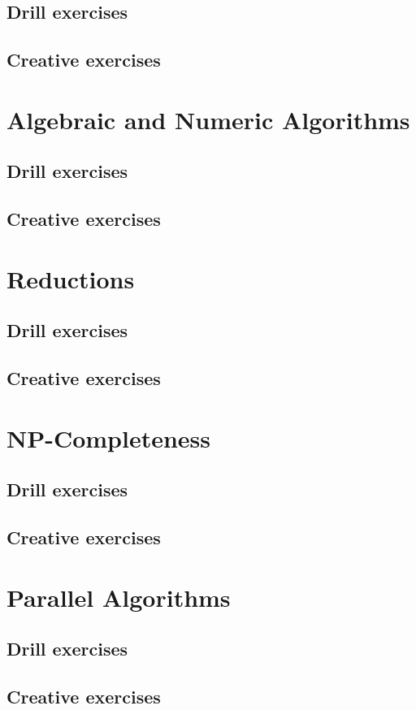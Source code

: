 \documentclass[a4paper,11pt]{memoir}
\begin{document}
    \section*{Drill exercises}
    \section*{Creative exercises}

    \chapter{Algebraic and Numeric Algorithms}
    \section*{Drill exercises}
    \section*{Creative exercises}

    \chapter{Reductions}
    \section*{Drill exercises}
    \section*{Creative exercises}

    \chapter{NP-Completeness}
    \section*{Drill exercises}
    \section*{Creative exercises}

    \chapter{Parallel Algorithms}
    \section*{Drill exercises}
    \section*{Creative exercises}
\end{document}
